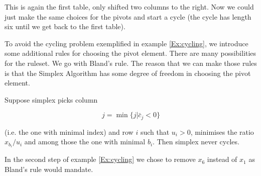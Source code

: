 \begin{Ex}[Cycling]
This is again the first table, only shifted two columns to the right. Now we could just make the same choices for the pivots and start a cycle (the cycle has length six until we get back to the first table).
\end{Ex}

To avoid the cycling problem exemplified in example \ref{Ex:cycling}, we introduce some additional rules for choosing the pivot element. There are many possibilities for the ruleset. We go with Bland's rule. The reason that we can make those rules is that the Simplex Algorithm has some degree of freedom in choosing the pivot element. 

\begin{thm}\label{Thm:blandsRule} Suppose simplex picks column 

\[j=\min \{j|\bar c_j < 0\}\]

(i.e. the one with minimal index) and row $i$ such that $u_i>0$, minimises the ratio $x_{b_i}/u_i$ and among those the one with minimal $b_i$. Then simplex never cycles.
\end{thm}

In the second step of example \ref{Ex:cycling} we chose to remove $x_6$ instead of $x_1$ as Bland's rule would mandate.

